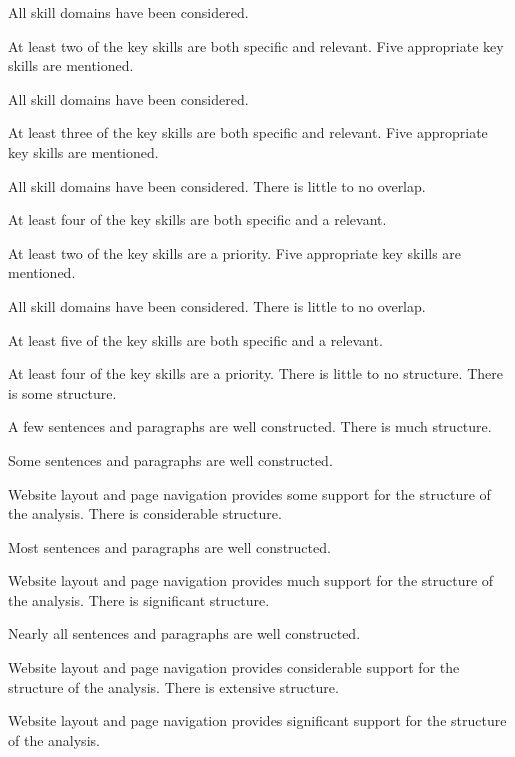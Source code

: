 \documentclass{../../fal_assignment}
\begin{document}
\begin{markingrubric}
        \par 		All skill domains have been considered.
        \par 		At least two of the key skills are both specific and relevant.
        \grade 		Five appropriate key skills are mentioned.
        \par 		All skill domains have been considered.
        \par 		At least three of the key skills are both specific and relevant.
        \grade 		Five appropriate key skills are mentioned.
        \par 		All skill domains have been considered. There is little to no overlap.
        \par 		At least four of the key skills are both specific and a relevant.
        \par 		At least two of the key skills are a priority.
        \grade 		Five appropriate key skills are mentioned.
        \par 		All skill domains have been considered. There is little to no overlap.
        \par 		At least five of the key skills are both specific and a relevant.
        \par 		At least four of the key skills are a priority.
%
        \grade\fail 	There is little to no structure.
        \grade 		There is some structure.
        \par 		A few sentences and paragraphs are well constructed.
        \grade 		There is much structure.
        \par 		Some sentences and paragraphs are well constructed.
        \par 		Website layout and page navigation provides some support for the structure of the analysis.
        \grade 		There is considerable structure.
        \par 		Most sentences and paragraphs are well constructed.
        \par 		Website layout and page navigation provides much support for the structure of the analysis.
        \grade 		There is significant structure.
        \par 		Nearly all sentences and paragraphs are well constructed.
        \par 		Website layout and page navigation provides considerable support for the structure of the analysis.
        \grade 		There is extensive structure.
        \par 		Website layout and page navigation provides significant support for the structure of the analysis.


\end{markingrubric}
\end{document}
